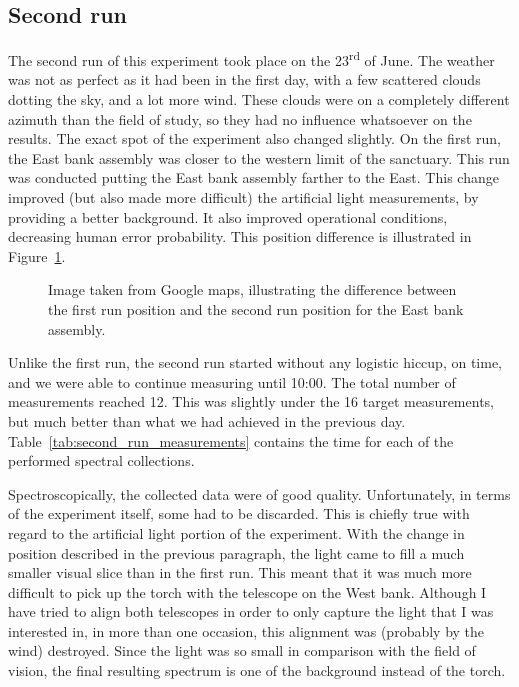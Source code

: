 \subsection{Second run}%
\label{sub:second_run}

The second run of this experiment took place on the
23\textsuperscript{rd} of June. The weather was not as perfect as it had
been in the first day, with a few scattered clouds dotting the sky, and
a lot more wind. These clouds were on a completely different azimuth
than the field of study, so they had no influence whatsoever on the
results. The exact spot of the experiment also changed slightly. On the
first run, the East bank assembly was closer to the western limit of the
sanctuary. This run was conducted putting the East bank assembly farther
to the East. This change improved (but also made more difficult) the
artificial light measurements, by providing a better background. It also
improved operational conditions, decreasing human error probability.
This position difference is illustrated in
Figure~\ref{fig:changing_position}.

\begin{figure}[htpb]
    \centering
    \missingfigure{}
    \caption{Image taken from Google maps, illustrating the difference
    between the first run position and the second run position for the
    East bank assembly.}
    \label{fig:changing_position}
\end{figure}

Unlike the first run, the second run started without any logistic
hiccup, on time, and we were able to continue measuring until 10:00.
The total number of measurements reached 12. This was slightly under the
16 target measurements, but much better than what we had achieved in the
previous day. Table~\ref{tab:second_run_measurements} contains the time
for each of the performed spectral collections.

\begin{table}[htpb]
    \centering
    \caption{Second run: time of measurements table.}
    \label{tab:second_run_measurements}
    
\end{table}

Spectroscopically, the collected data were of good quality.
Unfortunately, in terms of the experiment itself, some had to be
discarded. This is chiefly true with regard to the artificial light
portion of the experiment. With the change in position described in the
previous paragraph, the light came to fill a much smaller visual slice
than in the first run. This meant that it was much more difficult to
pick up the torch with the telescope on the West bank. Although I have
tried to align both telescopes in order to only capture the light that I
was interested in, in more than one occasion, this alignment was
(probably by the wind) destroyed. Since the light was so small in
comparison with the field of vision, the final resulting spectrum is one
of the background instead of the torch.

